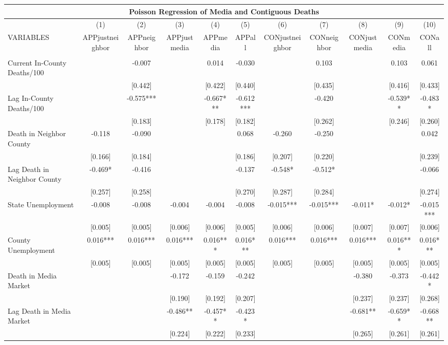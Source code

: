 \documentclass[]{article}
\begin{document}
\begin{tabular}{lcccccccccc}
\multicolumn{11}{c}{Poisson Regression of Media and Contiguous Deaths} \\ \hline
 & (1) & (2) & (3) & (4) & (5) & (6) & (7) & (8) & (9) & (10) \\
VARIABLES & APPjustneighbor & APPneighbor & APPjustmedia & APPmedia & APPall & CONjustneighbor & CONneighbor & CONjustmedia & CONmedia & CONall \\ \hline
 &  &  &  &  &  &  &  &  &  &  \\
Current In-County Deaths/100 &  & -0.007 &  & 0.014 & -0.030 &  & 0.103 &  & 0.103 & 0.061 \\
 &  & [0.442] &  & [0.422] & [0.440] &  & [0.435] &  & [0.416] & [0.433] \\
Lag In-County Deaths/100 &  & -0.575*** &  & -0.667*** & -0.612*** &  & -0.420 &  & -0.539** & -0.483* \\
 &  & [0.183] &  & [0.178] & [0.182] &  & [0.262] &  & [0.246] & [0.260] \\
Death in Neighbor County & -0.118 & -0.090 &  &  & 0.068 & -0.260 & -0.250 &  &  & 0.042 \\
 & [0.166] & [0.184] &  &  & [0.186] & [0.207] & [0.220] &  &  & [0.239] \\
Lag Death in Neighbor County & -0.469* & -0.416 &  &  & -0.137 & -0.548* & -0.512* &  &  & -0.066 \\
 & [0.257] & [0.258] &  &  & [0.270] & [0.287] & [0.284] &  &  & [0.274] \\
State Unemployment & -0.008 & -0.008 & -0.004 & -0.004 & -0.008 & -0.015*** & -0.015*** & -0.011* & -0.012* & -0.015*** \\
 & [0.005] & [0.005] & [0.006] & [0.006] & [0.005] & [0.006] & [0.006] & [0.007] & [0.007] & [0.006] \\
County Unemployment & 0.016*** & 0.016*** & 0.016*** & 0.016*** & 0.016*** & 0.016*** & 0.016*** & 0.016*** & 0.016*** & 0.016*** \\
 & [0.005] & [0.005] & [0.005] & [0.005] & [0.005] & [0.005] & [0.005] & [0.005] & [0.005] & [0.005] \\
Death in Media Market &  &  & -0.172 & -0.159 & -0.242 &  &  & -0.380 & -0.373 & -0.442* \\
 &  &  & [0.190] & [0.192] & [0.207] &  &  & [0.237] & [0.237] & [0.268] \\
Lag Death in Media Market &  &  & -0.486** & -0.457** & -0.423* &  &  & -0.681** & -0.659** & -0.668** \\
 &  &  & [0.224] & [0.222] & [0.233] &  &  & [0.265] & [0.261] & [0.261] \\

\end{tabular}
\end{document}
